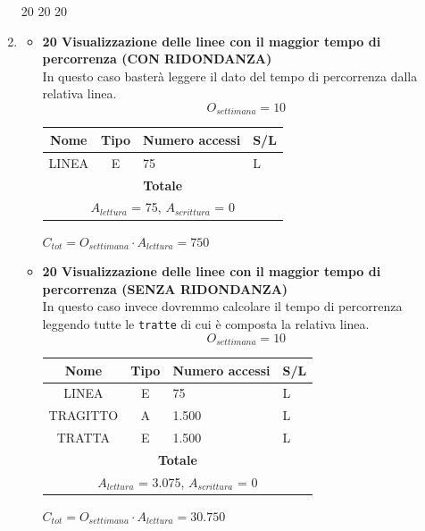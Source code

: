 \documentclass[12pt,a4paper]{report}
\begin{document}
\begin{enumerate}[label=\textbf{\arabic*)}]
20 20 20
\item 
    \begin{itemize}
        \item \textbf{20 Visualizzazione delle linee con il maggior
        tempo di percorrenza (CON RIDONDANZA)} \\
        In questo caso basterà leggere il dato del tempo di percorrenza dalla relativa linea.
        \[ {O_{settimana} = 10} \]
        \begin{table}[H]
        \centering
        \begin{tabular}{|c|c|l|l|}
        \hline
        \textbf{Nome} & \textbf{Tipo} & \textbf{Numero accessi} & \textbf{S/L} \\
        \hline
        LINEA & E & 75 & L \\ 
        \hline
        \multicolumn{4}{c}{\textbf{Totale}} \\    
        \multicolumn{4}{c}{${A_{lettura}}$ = 75, ${A_{scrittura}}$ = 0} \\
        \hline
        \end{tabular}
        \end{table}
        \begin{center}
        ${C_{tot} = {O_{settimana}}\cdot {A_{lettura}} = 750}$
        \end{center}

        \item \textbf{20 Visualizzazione delle linee con il maggior
        tempo di percorrenza (SENZA RIDONDANZA)} \\
        In questo caso invece dovremmo calcolare il tempo di percorrenza leggendo tutte le \texttt{tratte} di cui è composta la relativa linea.
        \[ {O_{settimana} = 10} \]
        \begin{table}[H]
        \centering
        \begin{tabular}{|c|c|l|l|}
        \hline
        \textbf{Nome} & \textbf{Tipo} & \textbf{Numero accessi} & \textbf{S/L} \\
        \hline
        LINEA & E & 75 & L \\ 
        \hline
        TRAGITTO & A & 1.500 & L \\
        \hline
        TRATTA & E & 1.500 & L \\
        \hline
        \multicolumn{4}{c}{\textbf{Totale}} \\    
        \multicolumn{4}{c}{${A_{lettura}}$ = 3.075, ${A_{scrittura}}$ = 0} \\
        \hline
        \end{tabular}
        \end{table}
        \begin{center}
        ${C_{tot} = {O_{settimana}}\cdot {A_{lettura}} = 30.750}$
        \end{center}     
    \end{itemize}


\end{enumerate}
\end{document}
